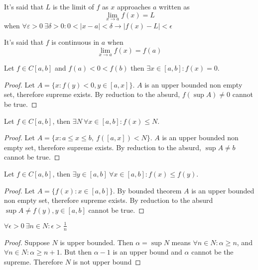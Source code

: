 \documentclass[../main.tex]{subfiles}
\begin{document}
\begin{definition}[Limit]
    It's said that $L$ is the limit of $f$ as $x$ approaches $a$ written as
    $$
    \lim_{x\rightarrow a}f(x) = L
    $$
    when $\forall \varepsilon >0\ \exists\delta>0: 0<|x-a|<\delta \rightarrow |f(x) - L| < \epsilon
    $
\end{definition}
\begin{definition}[Continuity]
    It's said that $f$ is continuous in $a$ when
    $$
    \lim_{x\rightarrow a} f(x) = f(a)
    $$
\end{definition}
\begin{theorem}
    Let $f\in C[a,b]$ and $f(a) < 0 < f(b)$ then $\exists x\in [a,b]: f(x)=0$.
\end{theorem}
\begin{proof}
    Let $A = \{ x : f(y) < 0, y \in [a, x] \}$. $A$ is an upper bounded non empty set, therefore supreme exists. By reduction to the absurd, $f(\sup A) \neq 0$ cannot be true.
\end{proof}
\begin{theorem}
    Let $f\in C[a,b]$, then $\exists N \ \forall x\in[a,b]: f(x)\leq N$.
\end{theorem}
\begin{proof}
    Let $A = \{ x : a\le x\le b, \  f([a, x])<N\}$. $A$ is an upper bounded non empty set, therefore supreme exists. By reduction to the absurd, $\sup A \neq b$ cannot be true.
\end{proof}
\begin{theorem}
    Let $f\in C[a,b]$, then $\exists y\in [a,b] \ \forall x\in [a,b]: f(x) \leq f(y)$.
\end{theorem}
\begin{proof}
    Let $A = \{ f(x) : x\in [a,b] \}$. By bounded theorem $A$ is an upper bounded non empty set, therefore supreme exists. By reduction to the absurd $\sup A \neq f(y), y\in [a,b]$ cannot be true.
\end{proof}
\begin{theorem}
    $\forall \epsilon > 0 \ \exists n\in N: \epsilon > \frac{1}{n}$
\end{theorem}
\begin{proof}
    Suppose $N$ is upper bounded. Then $\alpha = \sup N$ means $\forall n\in N: \alpha \ge n$, and $\forall n\in N: \alpha \ge n+1$. But then $\alpha - 1$ is an upper bound and $\alpha$ cannot be the supreme. Therefore $N$ is not upper bound
\end{proof}
\end{document}

